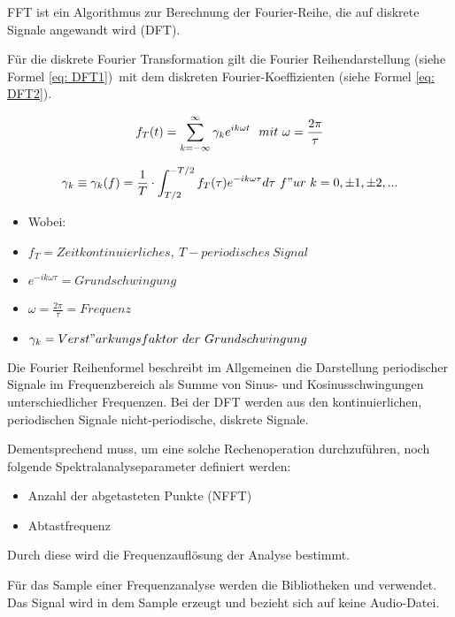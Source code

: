FFT ist ein Algorithmus zur Berechnung der Fourier-Reihe, die auf diskrete Signale angewandt wird (DFT).

Für die diskrete Fourier Transformation gilt die Fourier Reihendarstellung (siehe Formel \ref{eq: DFT1})\ mit dem diskreten Fourier-Koeffizienten (siehe Formel \ref{eq: DFT2}).

\begin{equation}
    f_T(t)= \sum_{k=-\infty}^{\infty}\gamma_ke^{ik\omega t} \ \ mit \ \omega=\frac{2\pi}{\tau} \\
\end{equation}
\label{eq: DFT1}




\begin{equation}
    \gamma_k \equiv \gamma_k(f)=\frac{1}{T}\cdot \int_{T/2}^{-T/2} f_T(\tau)e^{-ik\omega \tau} d\tau \ 
    f"ur \ k= 0,\pm 1,\pm 2,...
\end{equation}
\label{eq: DFT2}

\begin{itemize}
    \item[] Wobei:
    \item[] $f_T = Zeitkontinuierliches,\ T-periodisches\ Signal$
    \item[] $e^{-ik\omega \tau} = Grundschwingung$
    \item[] $\omega=\frac{2\pi}{\tau} = Frequenz$
    \item[] $\gamma_k = Verst"arkungsfaktor \ der \ Grundschwingung$
\end{itemize}


Die Fourier Reihenformel beschreibt im Allgemeinen die Darstellung periodischer Signale im Frequenzbereich als Summe von Sinus- und Kosinusschwingungen unterschiedlicher Frequenzen.
Bei der DFT werden aus den kontinuierlichen, periodischen Signale nicht-periodische, diskrete Signale. \Mynote{cite}


Dementsprechend muss, um eine solche Rechenoperation durchzuführen, noch folgende Spektralanalyseparameter definiert werden:

\begin{itemize}
    \item Anzahl der abgetasteten Punkte (NFFT)
    \item Abtastfrequenz
\end{itemize}
Durch diese wird die Frequenzauflösung der Analyse bestimmt.

Für das Sample einer Frequenzanalyse werden die Bibliotheken  und  verwendet. 
Das Signal wird in dem Sample erzeugt und bezieht sich auf keine Audio-Datei.

